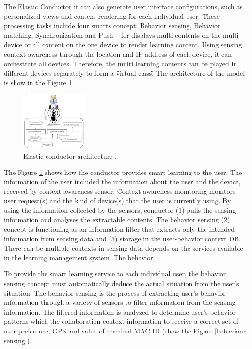 \documentclass[journal]{vgtc}                %
\begin{document}
  The Elastic Conductor it can also generate user interface configurations, such as personalized views and content rendering for each individual user. These processing tasks include four smarts concept: Behavior sensing, Behavior matching, Synchronization and Push – for displays multi-contents on the multi-device or all content on the one device to render learning content. Using sensing context-awareness through the location and IP address of each device, it can orchestrate all devices. Therefore, the multi learning contents can be played in different devices separately to form a \"virtual class\". The architecture of the model is show in the Figure \ref{elastic-conductor}.

  \begin{figure}[htb]
    \centering
    \includegraphics[width=0.3\textwidth]{elastic-conductor}
    \caption{Elastic conductor architecture \cite{Kim2013}.}
    \label{elastic-conductor}
  \end{figure}

  The Figure \ref{elastic-conductor} shows how the conductor provides smart learning to the user. The information of the user included the information about the user and the device, received by context-awareness sensor. Context-awareness monitoring monitors user request(s) and the kind of device(s) that the user is currently using. By using the information collected by the sensors, conductor (1) pulls the sensing information and analyses the extractable contents. The behavior sensing (2) concept is functioning as an information filter that extracts only the intended information from sensing data and (3) storage in the user-behavior context DB. There can be multiple contexts in sensing data depends on the services available in the learning management system. The behavior

  To provide the smart learning service to each individual user, the behavior sensing concept must automatically deduce the actual situation from the user's situation. The behavior sensing is the process of extracting user's behavior information through a variety of sensors to filter information from the sensing information. The filtered information is analyzed to determine user's behavior patterns which the collaboration context information to receive a correct set of user preference, GPS and value of terminal MAC-ID (show the Figure \ref{behaviour-sensing}).
\end{document}
